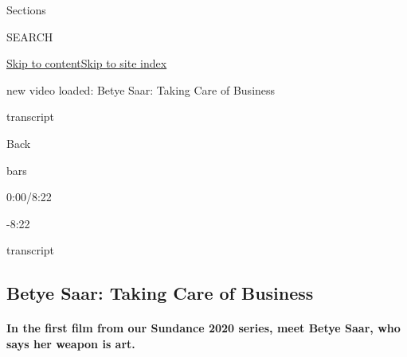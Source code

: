 Sections

SEARCH

\protect\hyperlink{site-content}{Skip to
content}\protect\hyperlink{site-index}{Skip to site index}

new video loaded: Betye Saar: Taking Care of Business

transcript

Back

bars

0:00/8:22

-8:22

transcript

\hypertarget{betye-saar-taking-care-of-business}{%
\subsection{Betye Saar: Taking Care of
Business}\label{betye-saar-taking-care-of-business}}

\hypertarget{in-the-first-film-from-our-sundance-2020-series-meet-betye-saar-who-says-her-weapon-is-art}{%
\paragraph{In the first film from our Sundance 2020 series, meet Betye
Saar, who says her weapon is
art.}\label{in-the-first-film-from-our-sundance-2020-series-meet-betye-saar-who-says-her-weapon-is-art}}


